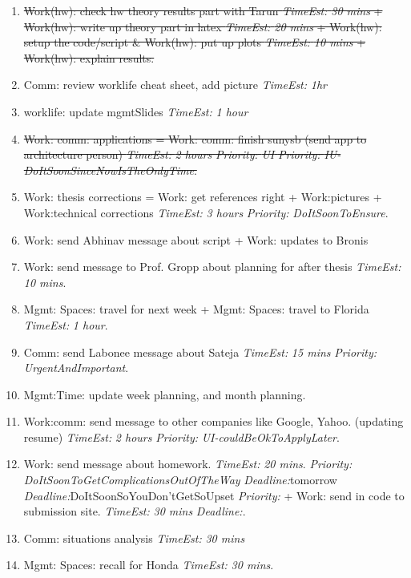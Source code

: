 \documentclass[11pt]{article}
\newcommand{\doneTask}[1]{\item \sout{\small #1}}
\newcommand{\te}[1]{\textit{TimeEst:} \textit{#1}}
\newcommand{\prio}[1]{\textit{Priority:} \textit{#1}}
\newcommand{\dl}[1]{\textit{Deadline:}#1}
\begin{document}
\begin{enumerate} 

\doneTask{ Work(hw): check hw theory results part with Tarun \te{30
    mins} + Work(hw): write up theory part in latex \te{20 mins}
  + Work(hw): setup the code/script \& Work(hw): put up plots \te{10
    mins}  + Work(hw): explain results.} 

\item Comm: review worklife cheat sheet, add picture \te{1hr} 

\item worklife: update mgmtSlides \te{1 hour} 

\doneTask{Work: comm: applications = Work: comm: finish sunysb (send
  app to architecture person) \te{2 hours} \prio{UI}
  \prio{IU-DoItSoonSinceNowIsTheOnlyTime}.}


\item Work: thesis corrections = Work: get references right +
  Work:pictures + Work:technical corrections \te{3 hours} 
\prio{DoItSoonToEnsure}.

\item Work: send Abhinav message about script   + Work: updates to
  Bronis 

\item Work: send message to Prof. Gropp about planning for after
  thesis \te{10 mins}. 

\item Mgmt: Spaces: travel for next week + Mgmt: Spaces: travel to
  Florida \te{1 hour}. 

\item Comm: send Labonee message about Sateja \te{15 mins}
  \prio{UrgentAndImportant}.

\item Mgmt:Time: update week planning, and month planning. 

\item Work:comm: send message to other companies like Google,
  Yahoo. (updating resume) \te{2 hours}
  \prio{UI-couldBeOkToApplyLater}. 

\item Work: send message about homework. \te{20 mins}. 
  \prio{DoItSoonToGetComplicationsOutOfTheWay} \dl{tomorrow}
  \dl{DoItSoonSoYouDon'tGetSoUpset}  \prio{ }  + Work: send in code to
  submission site. \te{30 mins} \dl{}. 
\item Comm: situations analysis \te{ 30 mins } 

\item Mgmt: Spaces: recall for Honda \te{30 mins}. 


\end{enumerate}
\end{document}
